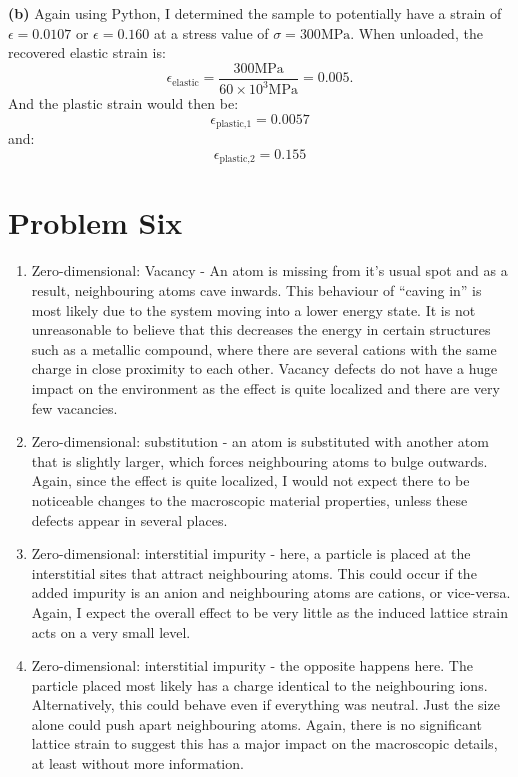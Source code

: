 \documentclass{article}
\begin{document}
    \textbf{(b)} Again using Python, I determined the sample to potentially have a strain of $\epsilon = 0.0107$ or $\epsilon = 0.160$ at a stress value of $\sigma=300\si{\mega\pascal}$. When unloaded, the recovered elastic strain is:
    \begin{equation}
        \epsilon_\text{elastic} = \frac{300 \si{\mega\pascal}}{60 \times 10^3 \si{\mega\pascal}} = 0.005.
    \end{equation}
    And the plastic strain would then be:
    \begin{equation}
        \epsilon_\text{plastic,1} = 0.0057
    \end{equation}
    and:
    \begin{equation}
        \epsilon_\text{plastic,2} = 0.155
    \end{equation}
    \section*{Problem Six}
    \begin{enumerate}[label=\textbf{(\alph*)}]
        \item Zero-dimensional: Vacancy - An atom is missing from it's usual spot and as a result, neighbouring atoms cave inwards. This behaviour of ``caving in'' is most likely due to the system moving into a lower energy state. It is not unreasonable to believe that this decreases the energy in certain structures such as a metallic compound, where there are several cations with the same charge in close proximity to each other. Vacancy defects do not have a huge impact on the environment as the effect is quite localized and there are very few vacancies.
        \item Zero-dimensional: substitution - an atom is substituted with another atom that is slightly larger, which forces neighbouring atoms to bulge outwards. Again, since the effect is quite localized, I would not expect there to be noticeable changes to the macroscopic material properties, unless these defects appear in several places.
        \item Zero-dimensional: interstitial impurity - here, a particle is placed at the interstitial sites that attract neighbouring atoms. This could occur if the added impurity is an anion and neighbouring atoms are cations, or vice-versa. Again, I expect the overall effect to be very little as the induced lattice strain acts on a very small level. 
        \item Zero-dimensional: interstitial impurity - the opposite happens here. The particle placed most likely has a charge identical to the neighbouring ions. Alternatively, this could behave even if everything was neutral. Just the size alone could push apart neighbouring atoms. Again, there is no significant lattice strain to suggest this has a major impact on the macroscopic details, at least without more information.
    \end{enumerate}
\end{document}
